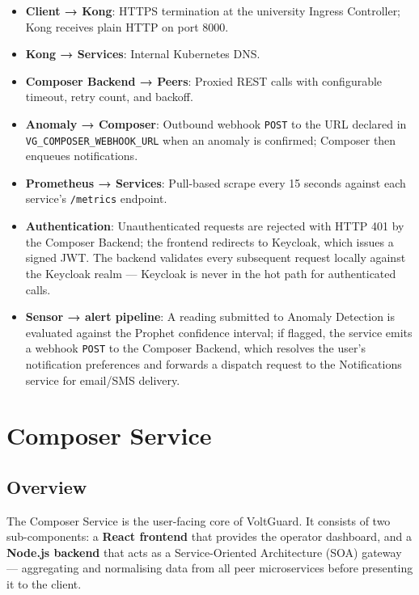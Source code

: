 \documentclass[12pt,a4paper,oneside]{report}
\begin{document}
\begin{itemize}[noitemsep]
  \item \textbf{Client → Kong}: HTTPS termination at the university Ingress Controller; Kong receives plain HTTP on port 8000.
  \item \textbf{Kong → Services}: Internal Kubernetes DNS.
  \item \textbf{Composer Backend → Peers}: Proxied REST calls with configurable timeout, retry count, and backoff.
  \item \textbf{Anomaly → Composer}: Outbound webhook \texttt{POST} to the URL declared in \texttt{VG\_COMPOSER\_WEBHOOK\_URL} when an anomaly is confirmed; Composer then enqueues notifications.
  \item \textbf{Prometheus → Services}: Pull-based scrape every 15 seconds against each service's \texttt{/metrics} endpoint.
  \item \textbf{Authentication}: Unauthenticated requests are rejected with HTTP 401 by the Composer Backend; the frontend redirects to Keycloak, which issues a signed JWT. The backend validates every subsequent request locally against the Keycloak realm — Keycloak is never in the hot path for authenticated calls.
  \item \textbf{Sensor → alert pipeline}: A reading submitted to Anomaly Detection is evaluated against the Prophet confidence interval; if flagged, the service emits a webhook \texttt{POST} to the Composer Backend, which resolves the user's notification preferences and forwards a dispatch request to the Notifications service for email/SMS delivery.
\end{itemize}

\chapter{Composer Service}
\label{ch:composer}

\section{Overview}

The Composer Service is the user-facing core of VoltGuard. It consists of two sub-components: a \textbf{React frontend} that provides the operator dashboard, and a \textbf{Node.js backend} that acts as a Service-Oriented Architecture (SOA) gateway — aggregating and normalising data from all peer microservices before presenting it to the client.
\end{document}
